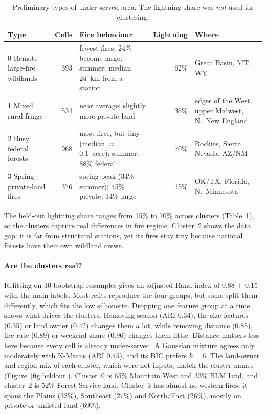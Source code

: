 \documentclass[10pt,twocolumn,letterpaper]{article}
\begin{document}
\begin{table}[t]
\centering\small
\caption{Preliminary types of under-served area. The lightning share was \emph{not} used for clustering.}
\label{tab:clusters}
\begin{tabularx}{\textwidth}{@{}lrXrX@{}}
\toprule
Type & Cells & Fire behaviour & Lightning & Where \\
\midrule
0 Remote large-fire wildlands & 393 & fewest fires; 24\% become large; summer; median 24~km from a station & 62\% & Great Basin, MT, WY \\
1 Mixed rural fringe & 534 & near average; slightly more private land & 36\% & edges of the West, upper Midwest, N.\ New England \\
2 Busy federal forests & 968 & most fires, but tiny (median $\approx$0.1~acre); summer; 88\% federal & 70\% & Rockies, Sierra Nevada, AZ/NM \\
3 Spring private-land fires & 376 & spring peak (34\% summer); 45\% private; 14\% large & 15\% & OK/TX, Florida, N.\ Minnesota \\
\bottomrule
\end{tabularx}
\end{table}

The held-out lightning share ranges from 15\% to 70\% across clusters (Table~\ref{tab:clusters}), so the clusters capture real differences in fire regime. Cluster~2 shows the data gap: it is far from structural stations, yet its fires stay tiny because national forests have their own wildland crews.

\paragraph{Are the clusters real?} Refitting on 30 bootstrap resamples gives an adjusted Rand index of 0.88 $\pm$ 0.15 with the main labels. Most refits reproduce the four groups, but some split them differently, which fits the low silhouette. Dropping one feature group at a time shows what drives the clusters. Removing season (ARI 0.34), the size features (0.35) or land owner (0.42) changes them a lot, while removing distance (0.85), fire rate (0.89) or weekend share (0.96) changes them little. Distance matters less here because every cell is already under-served. A Gaussian mixture agrees only moderately with K-Means (ARI 0.45), and its BIC prefers $k=6$. The land-owner and region mix of each cluster, which were not inputs, match the cluster names (Figure~\ref{fig:heldout}). Cluster~0 is 65\% Mountain West and 33\% BLM land, and cluster~2 is 52\% Forest Service land. Cluster~3 has almost no western fires: it spans the Plains (33\%), Southeast (27\%) and North/East (26\%), mostly on private or unlisted land (69\%).
\end{document}
